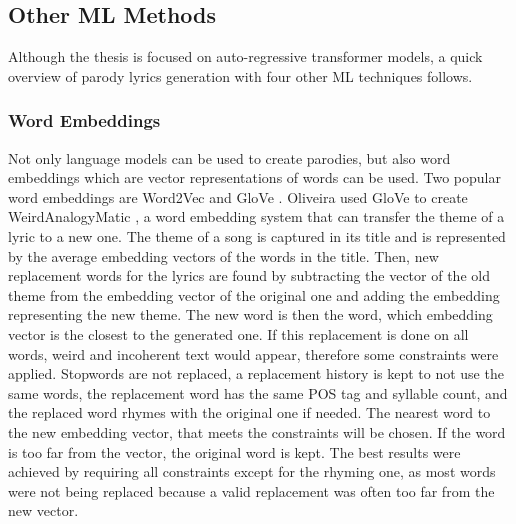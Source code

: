 \subsection{Other ML Methods}
Although the thesis is focused on auto-regressive transformer models, a quick overview of parody lyrics generation with four other ML techniques follows. 
\subsubsection{Word Embeddings}
Not only language models can be used to create parodies, but also word embeddings which are vector representations of words can be used. Two popular word embeddings are Word2Vec \cite{mikolov_efficient_2013} and GloVe \cite{pennington_glove_2014}. Oliveira used GloVe to create WeirdAnalogyMatic \cite{oliveira_weirdanalogymatic_2020}, a word embedding system that can transfer the theme of a lyric to a new one. The theme of a song is captured in its title and is represented by the average embedding vectors of the words in the title. Then, new replacement words for the lyrics are found by subtracting the vector of the old theme from the embedding vector of the original one and adding the embedding representing the new theme. The new word is then the word, which embedding vector is the closest to the generated one. If this replacement is done on all words, weird and incoherent text would appear, therefore some constraints were applied. Stopwords are not replaced, a replacement history is kept to not use the same words, the replacement word has the same POS tag and syllable count, and the replaced word rhymes with the original one if needed. The nearest word to the new embedding vector, that meets the constraints will be chosen. If the word is too far from the vector, the original word is kept. The best results were achieved by requiring all constraints except for the rhyming one, as most words were not being replaced because a valid replacement was often too far from the new vector. 

